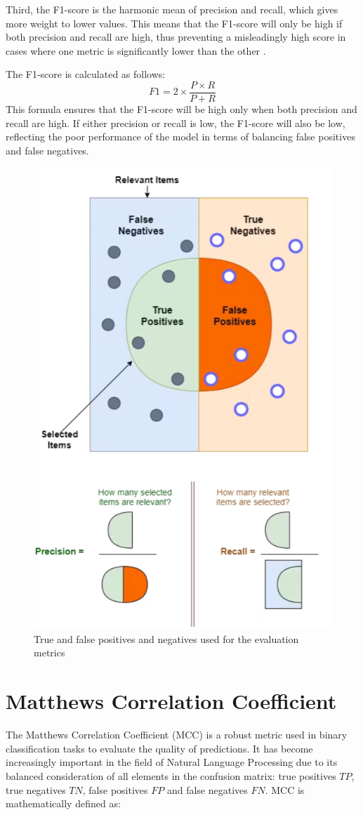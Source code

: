 \documentclass{Configuration_Files/PoliMi3i_thesis}
\begin{document}
Third, the F1-score is the harmonic mean of precision and recall, which gives more weight to lower values. This means that the F1-score will only be high if both precision and recall are high, thus preventing a misleadingly high score in cases where one metric is significantly lower than the other \cite{powers2020evaluation}.

The F1-score is calculated as follows:
\[
F1 = 2 \times \frac{P \times R}{P + R}
\]
This formula ensures that the F1-score will be high only when both precision and recall are high. If either precision or recall is low, the F1-score will also be low, reflecting the poor performance of the model in terms of balancing false positives and false negatives.


\begin{figure}[h]
 \centering
 \includegraphics[width=0.53\linewidth]{TF_positive}\caption{True and false positives and negatives used for the evaluation metrics \cite{encord_metrics}}
 \label{fig:true_false_pos}
\end{figure}
\FloatBarrier


\section{Matthews Correlation Coefficient} \label{sec:MCC}
The Matthews Correlation Coefficient (MCC) \cite{chicco2020advantages} is a robust metric used in binary classification tasks to evaluate the quality of predictions. It has become increasingly important in the field of Natural Language Processing due to its balanced consideration of all elements in the confusion matrix: true positives \( TP \), true negatives \( TN \), false positives \( FP \) and false negatives \( FN \). MCC is mathematically defined as:
\end{document}
